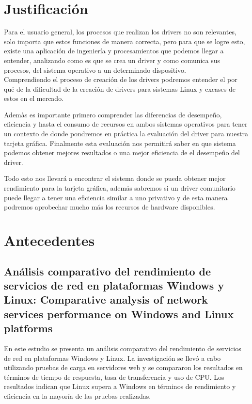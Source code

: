 \documentclass[conference]{IEEEtran}
\begin{document}
\section{Justificación}
Para el usuario general, los procesos que realizan los drivers no son relevantes, solo importa que estos funciones de manera correcta, pero para que se logre esto, existe una aplicación de ingeniería y procesamientos que podemos llegar a entender, analizando como es que se crea un driver y como comunica sus procesos, del sistema operativo a un determinado dispositivo.\\

Comprendiendo el proceso de creación de los drivers podremos entender el por qué de la dificultad de la creación de drivers para sistemas Linux y excases de estos en el mercado.

Ademàs es importante primero comprender las diferencias de desempeño, eficiencia y hasta el consumo de recursos en ambos sistemas operativos para tener un contexto de donde pondremos en práctica la evaluación del driver para nuestra tarjeta gráfica. Finalmente esta evaluación nos permitirá saber en que sistema podemos obtener mejores resultados o una mejor eficiencia de el desempeño del driver. 

Todo esto nos llevará a encontrar el sistema donde se pueda obtener mejor rendimiento para la tarjeta gráfica, además sabremos si un driver comunitario puede llegar a tener una eficiencia similar a uno privativo y de esta manera podremos aprobechar mucho más los recursos de hardware disponibles.

\section{Antecedentes}
\subsection{An{\'a}lisis comparativo del rendimiento de servicios de red en plataformas Windows y Linux: Comparative analysis of network services performance on Windows and Linux platforms}
\cite{ortiz2024analisis} En este estudio se presenta un análisis comparativo del rendimiento de servicios de red en plataformas Windows y Linux. La investigación se llevó a cabo utilizando pruebas de carga en servidores web y se compararon los resultados en términos de tiempo de respuesta, tasa de transferencia y uso de CPU. Los resultados indican que Linux supera a Windows en términos de rendimiento y eficiencia en la mayoría de las pruebas realizadas.
\end{document}
